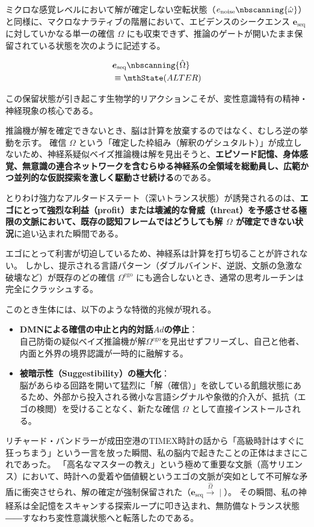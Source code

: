 ミクロな感覚レベルにおいて解が確定しない空転状態（$e_{\mathrm{noise}} \nbscanning{\hat{\omega}} $）と同様に、マクロなナラティブの階層において、エビデンスのシークエンス $\boldsymbol{e}_{\mathrm{seq}}$ に対していかなる単一の確信 $\Omega$ にも収束できず、推論のゲートが開いたまま保留されている状態を次のように記述する。

\begin{align}
    &\boldsymbol{e}_{\mathrm{seq}} \nbscanning{\hat{\Omega}} \\
    &\equiv \mthState(ALTER)
    \label{eq:asc_definition}
\end{align}

この保留状態が引き起こす生物学的リアクションこそが、変性意識特有の精神・神経現象の核心である。

推論機が解を確定できないとき、脳は計算を放棄するのではなく、むしろ逆の挙動を示す。
確信 $\Omega$ という「確定した枠組み（解釈のゲシュタルト）」が成立しないため、神経系疑似ベイズ推論機は解を見出そうと、\textbf{エピソード記憶、身体感覚、無意識の連合ネットワークを含むらゆる神経系の全領域を総動員し、広範かつ並列的な仮説探索を激しく駆動させ続ける}のである。

とりわけ強力なアルタードステート（深いトランス状態）が誘発されるのは、\textbf{エゴにとって強烈な利益（profit）または壊滅的な脅威（threat）を予感させる極限の文脈において、既存の認知フレームではどうしても解 $\Omega$ が確定できない状況}に追い込まれた瞬間である。

エゴにとって利害が切迫しているため、神経系は計算を打ち切ることが許されない。
しかし、提示される言語パターン（ダブルバインド、逆説、文脈の急激な破壊など）が既存のどの確信 $\Omega^{\mathrm{ego}}$ にも適合しないとき、通常の思考ルーチンは完全にクラッシュする。

このとき生体には、以下のような特徴的兆候が現れる。
\begin{itemize}
  \item \textbf{DMNによる確信の中止と内的対話$Ad$の停止}：\\
      自己防衛の疑似ベイズ推論機が解$\Omega^{\mathrm{ego}}$を見出せずフリーズし、自己と他者、内面と外界の境界認識が一時的に融解する。
  \item \textbf{被暗示性（Suggestibility）の極大化}：\\
  脳があらゆる回路を開いて猛烈に「解（確信）」を欲している飢餓状態にあるため、外部から投入される微小な言語シグナルや象徴的介入が、抵抗（エゴの検閲）を受けることなく、新たな確信 $\Omega$ として直接インストールされる。
\end{itemize}

リチャード・バンドラーが成田空港のTIMEX時計の話から「高級時計はすぐに狂っちまう」という一言を放った瞬間、私の脳内で起きたことの正体はまさにこれであった。
「高名なマスターの教え」という極めて重要な文脈（高サリエンス）において、時計への愛着や価値観というエゴの文脈が突如として不可解な矛盾に衝突させられ、解の確定が強制保留された（$\boldsymbol{e}_{\mathrm{seq}} \xrightarrow[]{\hat{\Omega}} \mid$）。
その瞬間、私の神経系は全記憶をスキャンする探索ループに叩き込まれ、無防備なトランス状態――すなわち変性意識状態へと転落したのである。


